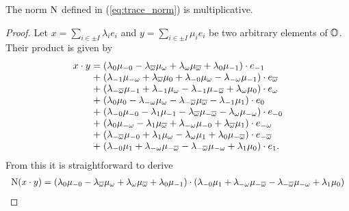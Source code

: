 \begin{lemma}
	\label{lemma:norm_multiplicative}
	The norm $\mathord{\mathrm{N}}$ defined in (\ref{eq:trace_norm}) is multiplicative.
\end{lemma}

\begin{proof}
	Let $x = \sum_{i \in \pm I} \lambda_i e_i$ and
	$y = \sum_{i \in \pm I} \mu_i e_i$ be two arbitrary elements of $\mathbb{O}$. Their product is
	given by
	\begin{equation*}
		\begin{array}{r@{\;}c@{\;}l}
			x \cdot y & = & (\lambda_0 \mu_{-0} - \lambda_{\bar{\omega}} \mu_{\omega}
				+ \lambda_{\omega} \mu_{\bar{\omega}} + \lambda_0 \mu_{-1}) \cdot e_{-1} \\
							
				&+ &   (\lambda_{-1} \mu_{-\omega} + \lambda_{\bar{\omega}} \mu_0 + 
			\lambda_{-0} \mu_{\omega} - \lambda_{-\omega} \mu_{-1}) \cdot e_{\bar{\omega}}  \\
					
				&+ &   (\lambda_{-\bar{\omega}} \mu_{-1} + \lambda_{-1} \mu_{\omega} - 
						\lambda_{-1} \mu_{-\bar{\omega}} + \lambda_{\omega} \mu_0) \cdot e_{\omega} \\
					
				&+ &   (\lambda_0 \mu_0 - \lambda_{-\omega} \mu_{\omega} - 
				\lambda_{-\bar{\omega}} \mu_{\bar{\omega}} - \lambda_{-1} \mu_1) \cdot e_0 \\
						
				&+ &   (\lambda_{-0} \mu_{-0} - \lambda_1 \mu_{-1} - 
	\lambda_{\bar{\omega}} \mu_{-\bar{\omega}}-\lambda_{\omega}\mu_{-\omega}) \cdot e_{-0} \\
				
				&+ &   (\lambda_0 \mu_{-\omega} - \lambda_1 \mu_{\bar{\omega}} + \lambda_{-\omega}
			\mu_{-0} + \lambda_{\bar{\omega}} \mu_1) \cdot e_{-\omega} \\
				
				&+ &   (\lambda_{-\bar{\omega}} \mu_{-0} + \lambda_1 \mu_{\omega} - 
				\lambda_{\omega} \mu_1 + 
				\lambda_0 \mu_{-\bar{\omega}}) \cdot e_{-\bar{\omega}} \\
			
				&+ &   (\lambda_{-0} \mu_1 + \lambda_{-\omega} \mu_{-\bar{\omega}} - 
			\lambda_{-\bar{\omega}} \mu_{-\omega} + \lambda_1 \mu_0) \cdot e_1 .
		\end{array}
	\end{equation*}
	From this it is straightforward to derive
	\begin{equation*}
		\begin{array}{r@{\;}c@{\;}l}
			\NN(x\cdot y) & = &
						(\lambda_0 \mu_{-0} - \lambda_{\bar{\omega}} \mu_{\omega}
				+ \lambda_{\omega} \mu_{\bar{\omega}} + \lambda_0 \mu_{-1})\cdot
					(\lambda_{-0} \mu_1 + \lambda_{-\omega} \mu_{-\bar{\omega}} - 
			\lambda_{-\bar{\omega}} \mu_{-\omega} + \lambda_1 \mu_0) \\
			

\end{array}
\end{equation*}
\end{proof}
